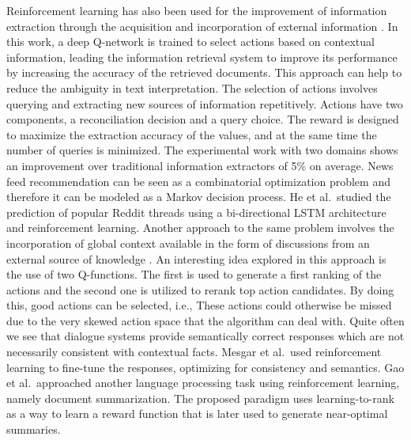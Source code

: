 Reinforcement learning has also been used for the improvement of information extraction through the acquisition and incorporation of external information . In this work, a deep Q-network is trained to select actions based on contextual information, leading the information retrieval system to improve its performance by increasing the accuracy of the retrieved documents. This approach can help to reduce the ambiguity in text interpretation. The selection of actions involves querying and extracting new sources of information repetitively. Actions have two components, a reconciliation decision and a query choice. The reward is designed to maximize the extraction accuracy of the values, and at the same time the number of queries is minimized. The experimental work with two domains shows an improvement over traditional information extractors of 5\% on average.
News feed recommendation can be seen as a combinatorial optimization problem and therefore it can be modeled as a Markov decision process. He et al.\  studied the prediction of popular Reddit threads using a bi-directional LSTM architecture and reinforcement learning. Another approach to the same problem involves the incorporation of global context available in the form of discussions from an external source of knowledge . An interesting idea explored in this approach is the use of two Q-functions. The first is used to generate a first ranking of the actions and the second one is utilized to rerank top action candidates. By doing this, good actions can be selected, i.e., These actions could otherwise be missed due to the very skewed action space that the algorithm can deal with.
Quite often we see that dialogue systems provide semantically correct responses which are not necessarily consistent with contextual facts. Mesgar et al.\  used reinforcement learning to fine-tune the responses, optimizing for consistency and semantics.
Gao et al.\  approached another language processing task using reinforcement learning, namely document summarization. The proposed paradigm uses learning-to-rank as a way to learn a reward function that is later used to generate near-optimal summaries.

